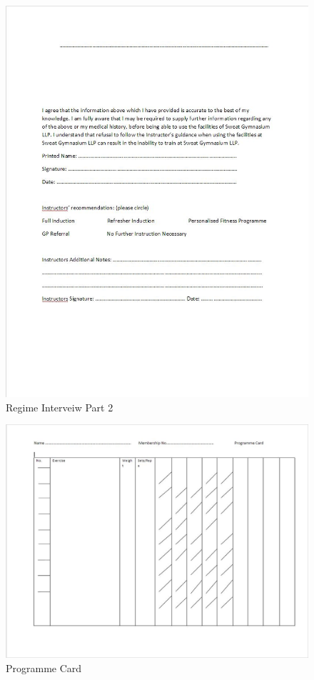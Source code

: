 \begin{figure}[H]
    \includegraphics[width=\textwidth]{RegimeInterveiw2.JPG}
    \caption{Regime Interveiw Part 2} \label{fig:Regime Interveiw Part 2}
\end{figure}

\begin{figure}[H]
    \includegraphics[width=\textwidth]{Programmecard.JPG}
    \caption{Programme Card} \label{fig:Programme Card}
\end{figure}

